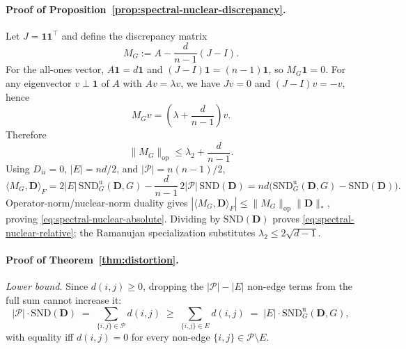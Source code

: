 \documentclass{article}
\theoremstyle{plain}
\theoremstyle{definition}
\theoremstyle{remark}
\newcommand{\Pairs}{\mathcal{P}}         %
\newcommand{\SND}{\ensuremath{\mathrm{SND}}}
\newcommand{\SNDG}{\mathrm{SND}_{G}}
\begin{document}
\paragraph{Proof of Proposition~\ref{prop:spectral-nuclear-discrepancy}.}
Let $J=\mathbf{1}\mathbf{1}^{\top}$ and define the discrepancy matrix
\[
M_G:=A-\frac{d}{n-1}(J-I).
\]
For the all-ones vector, $A\mathbf{1}=d\mathbf{1}$ and
$(J-I)\mathbf{1}=(n-1)\mathbf{1}$, so $M_G\mathbf{1}=0$.
For any eigenvector $v\perp\mathbf{1}$ of $A$ with
$Av=\lambda v$, we have $Jv=0$ and $(J-I)v=-v$, hence
\[
M_G v=\left(\lambda+\frac{d}{n-1}\right)v.
\]
Therefore
\[
\|M_G\|_{\mathrm{op}}
\leq
\lambda_2+\frac{d}{n-1}.
\]
Using $D_{ii}=0$, $|E|=nd/2$, and
$|\Pairs|=n(n-1)/2$,
\[
\langle M_G,\mathbf{D}\rangle_F
=
2|E|\,\SNDG^{\mathrm{u}}(\mathbf{D},G)
-\frac{d}{n-1}\,2|\Pairs|\,\SND(\mathbf{D})
=
nd\bigl(\SNDG^{\mathrm{u}}(\mathbf{D},G)-\SND(\mathbf{D})\bigr).
\]
Operator-norm/nuclear-norm duality gives
$|\langle M_G,\mathbf{D}\rangle_F|
\leq \|M_G\|_{\mathrm{op}}\|\mathbf{D}\|_*$, proving
\eqref{eq:spectral-nuclear-absolute}. Dividing by $\SND(\mathbf{D})$
proves \eqref{eq:spectral-nuclear-relative}; the Ramanujan specialization
substitutes $\lambda_2\leq2\sqrt{d-1}$.

\paragraph{Proof of Theorem~\ref{thm:distortion}.}

\emph{Lower bound.} Since $d(i,j) \geq 0$, dropping the
$|\Pairs|-|E|$ non-edge terms from the full sum cannot increase it:
\[
|\Pairs|\cdot\SND(\mathbf{D})
\;=\; \sum_{\{i,j\}\in\Pairs} d(i,j)
\;\geq\; \sum_{\{i,j\}\in E} d(i,j)
\;=\; |E|\cdot\SNDG^{\mathrm{u}}(\mathbf{D},G),
\]
with equality iff $d(i,j)=0$ for every non-edge
$\{i,j\}\in\Pairs\setminus E$.
\end{document}
